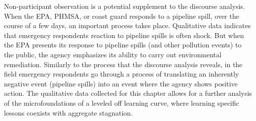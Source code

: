 Non-participant observation is a potential supplement to the discourse analysis. When the EPA, PHMSA, or coast guard responds to a pipeline spill, over the course of a few days, an important process takes place. Qualitative data indicates that emergency respondents reaction to pipeline spills is often shock. But when the EPA presents its response to pipeline spills (and other pollution events) to the public, the agency emphasizes its ability to carry out environmental remediation. Similarly to the process that the discourse analysis reveals, in the field emergency respondents go through a process of translating an inherently negative event (pipeline spills) into an event where the agency shows positive action. The qualitative data collected for this chapter allows for a further analysis of the microfoundations of a leveled off learning curve, where learning specific lessons coexists with aggregate stagnation.